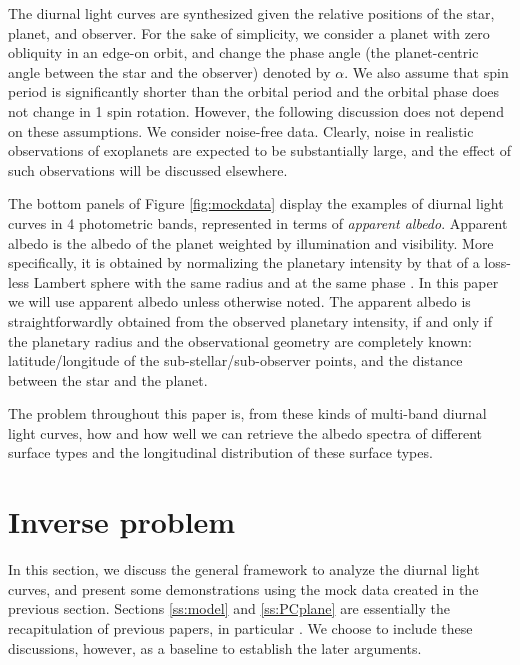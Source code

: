 \documentclass[iop,numberedappendix,apj]{emulateapj}
\def\memoJLY#1{\color{green}[JLY: {\bf #1}]\color{black}}
\begin{document}

{\color{red} 
The diurnal light curves are synthesized given the relative positions of the star, planet, and observer. 
For the sake of simplicity, we consider a planet with zero obliquity in an edge-on orbit, and change the phase angle (the planet-centric angle between the star and the observer) denoted by $\alpha $. 
We also assume that spin period is significantly shorter than the orbital period and the orbital phase does not change in 1 spin rotation. 
However, the following discussion does not depend on these assumptions. 
We consider noise-free data. Clearly, noise in realistic observations of exoplanets are expected to be substantially large, and the effect of such observations will be discussed elsewhere.}
\color{black}

The bottom panels of Figure \ref{fig:mockdata} display the examples of diurnal light curves in 4 photometric bands, represented in terms of {\it apparent albedo}. 
Apparent albedo is the albedo of the planet weighted by illumination and visibility. 
More specifically, it is obtained by normalizing the planetary intensity by that of a loss-less Lambert sphere with the same radius and at the same phase \citep{Qiu2003, Seager2010}. 
In this paper we will use apparent albedo unless otherwise noted. 
The apparent albedo is straightforwardly obtained from the observed planetary intensity, if and only if the planetary radius and the observational geometry are completely known: latitude/longitude of the sub-stellar/sub-observer points, and the distance between the star and the planet. 

The problem throughout this paper is, from these kinds of multi-band diurnal light curves, how and how well we can retrieve the albedo spectra of different surface types and the longitudinal distribution of these surface types. 


\section{Inverse problem}
\label{s:frame}

In this section, we discuss the general framework to analyze the diurnal light curves, and present some demonstrations using the mock data created in the previous section. 
Sections \ref{ss:model} and \ref{ss:PCplane} are essentially the recapitulation of previous papers, in particular \citet{Cowan2013} \citep[but see also][]{Cowan2009,Cowan2011,Fujii2010,Fujii2011}.  
We choose to include these discussions, however, as a baseline to establish the later arguments. 
\end{document}
